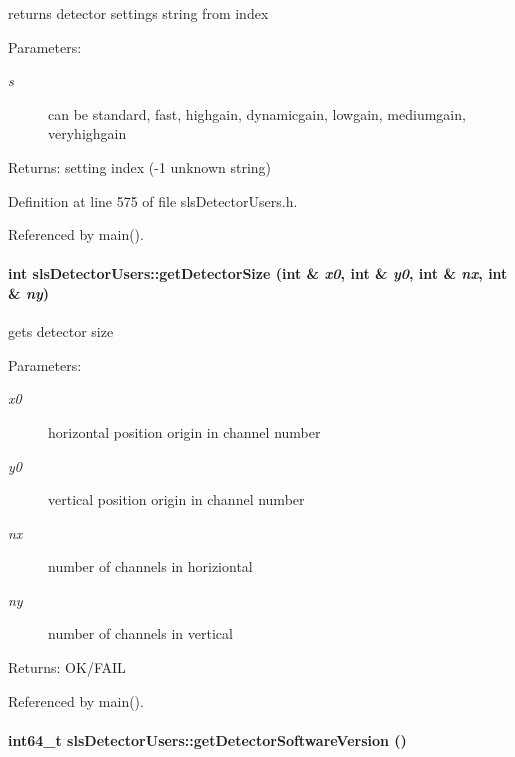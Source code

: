 returns detector settings string from index 

\begin{Desc}
\item[Parameters:]
\begin{description}
\item[{\em s}]can be standard, fast, highgain, dynamicgain, lowgain, mediumgain, veryhighgain \end{description}
\end{Desc}
\begin{Desc}
\item[Returns:]setting index (-1 unknown string) \end{Desc}


Definition at line 575 of file sls\-Detector\-Users.h.

Referenced by main().\hypertarget{classslsDetectorUsers_7f4fb3cefff5f0175cd2e4fd57ee1be4}{
\paragraph[getDetectorSize]{\setlength{\rightskip}{0pt plus 5cm}int sls\-Detector\-Users::get\-Detector\-Size (int \& {\em x0}, int \& {\em y0}, int \& {\em nx}, int \& {\em ny})}\hfill}
\label{classslsDetectorUsers_7f4fb3cefff5f0175cd2e4fd57ee1be4}


gets detector size 

\begin{Desc}
\item[Parameters:]
\begin{description}
\item[{\em x0}]horizontal position origin in channel number \item[{\em y0}]vertical position origin in channel number \item[{\em nx}]number of channels in horiziontal \item[{\em ny}]number of channels in vertical \end{description}
\end{Desc}
\begin{Desc}
\item[Returns:]OK/FAIL \end{Desc}


Referenced by main().\hypertarget{classslsDetectorUsers_1857f2afea58227cb96ad92f5e562a5e}{
\paragraph[getDetectorSoftwareVersion]{\setlength{\rightskip}{0pt plus 5cm}int64\_\-t sls\-Detector\-Users::get\-Detector\-Software\-Version ()}\hfill}
\label{classslsDetectorUsers_1857f2afea58227cb96ad92f5e562a5e}



